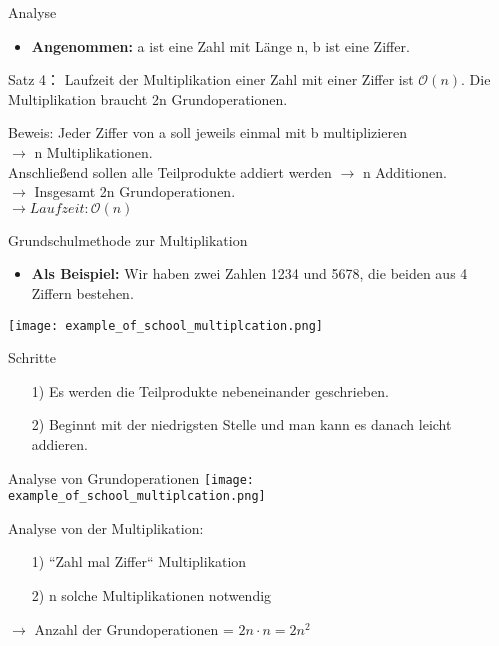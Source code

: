 \documentclass{beamer}
\begin{document}
\begin{frame}{Analyse}
\begin{itemize}
    \item  \textbf{Angenommen:} a ist eine Zahl mit Länge n, b ist eine Ziffer. 
\end{itemize}
    \begin{block}{Satz 4： }
    Laufzeit der Multiplikation einer Zahl mit einer Ziffer ist $\mathcal{O}(n)$. Die Multiplikation braucht 2n Grundoperationen.
    \end{block}
    
    \begin{block}{Beweis: }
    Jeder Ziffer von a soll jeweils einmal mit b multiplizieren\\ $\rightarrow$ n Multiplikationen.\\ Anschließend sollen alle Teilprodukte addiert werden $\rightarrow$ n Additionen. \\
    $\rightarrow$ Insgesamt 2n Grundoperationen.\\
    $\rightarrow Laufzeit: \mathcal{O}(n)$
    \end{block}
\end{frame}

\begin{frame}{Grundschulmethode zur Multiplikation}
\begin{itemize}
    \item \textbf{Als Beispiel:} Wir haben zwei Zahlen 1234 und 5678, die beiden aus 4 Ziffern bestehen. 
\end{itemize}
\texttt{[image: example\_of\_school\_multiplcation.png]}
\centering\\
\begin{block}{Schritte}
\begin{itemize}
    \item[1)] Es werden die Teilprodukte nebeneinander geschrieben. 
    \item[2)] Beginnt mit der niedrigsten Stelle und man kann es danach leicht  addieren. 
\end{itemize}
\end{block}
\end{frame}

\begin{frame}{Analyse von Grundoperationen}
\texttt{[image: example\_of\_school\_multiplcation.png]}
\begin{block}{Analyse von der Multiplikation:}
\begin{itemize}
    \item[1)] ``Zahl mal Ziffer`` Multiplikation
    \item[2)] n solche Multiplikationen notwendig 
\end{itemize}
$\rightarrow$ Anzahl der Grundoperationen = $2n \cdot n = 2n^2$
\end{block}
    
\end{frame}
\end{document}
